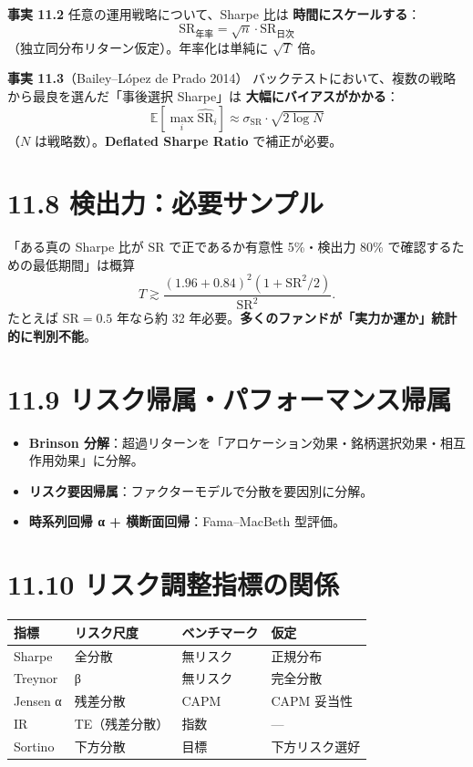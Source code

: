 \documentclass[11pt,a4paper]{report}
\begin{document}
\textbf{事実 11.2} 任意の運用戦略について、Sharpe 比は \textbf{時間にスケールする}： \[ \mathrm{SR}_{\text{年率}} = \sqrt{n} \cdot \mathrm{SR}_{\text{日次}} \] （独立同分布リターン仮定）。年率化は単純に $\sqrt{T}$ 倍。

\textbf{事実 11.3}（Bailey–López de Prado 2014） バックテストにおいて、複数の戦略から最良を選んだ「事後選択 Sharpe」は \textbf{大幅にバイアスがかかる}： \[ \mathbb{E}[\max_i \widehat{\mathrm{SR}}_i] \approx \sigma_{\mathrm{SR}} \cdot \sqrt{2\log N} \] （$N$ は戦略数）。\textbf{Deflated Sharpe Ratio} で補正が必要。

\section{11.8 検出力：必要サンプル}

「ある真の Sharpe 比が $\mathrm{SR}$ で正であるか有意性 5\%・検出力 80\% で確認するための最低期間」は概算 \[ T \gtrsim \frac{(1.96 + 0.84)^2 (1 + \mathrm{SR}^2/2)}{\mathrm{SR}^2}. \] たとえば $\mathrm{SR} = 0.5$ 年なら約 32 年必要。\textbf{多くのファンドが「実力か運か」統計的に判別不能}。

\section{11.9 リスク帰属・パフォーマンス帰属}

\begin{itemize}
\item \textbf{Brinson 分解}：超過リターンを「アロケーション効果・銘柄選択効果・相互作用効果」に分解。
\item \textbf{リスク要因帰属}：ファクターモデルで分散を要因別に分解。
\item \textbf{時系列回帰 α + 横断面回帰}：Fama–MacBeth 型評価。
\end{itemize}

\section{11.10 リスク調整指標の関係}

\begin{center}
\begin{tabular}{|l|l|l|l|}
\hline
指標 & リスク尺度 & ベンチマーク & 仮定 \\ \hline
Sharpe & 全分散 & 無リスク & 正規分布 \\ \hline
Treynor & β & 無リスク & 完全分散 \\ \hline
Jensen α & 残差分散 & CAPM & CAPM 妥当性 \\ \hline
IR & TE（残差分散） & 指数 & — \\ \hline
Sortino & 下方分散 & 目標 & 下方リスク選好 \\ \hline
\end{tabular}
\end{center}
\end{document}
